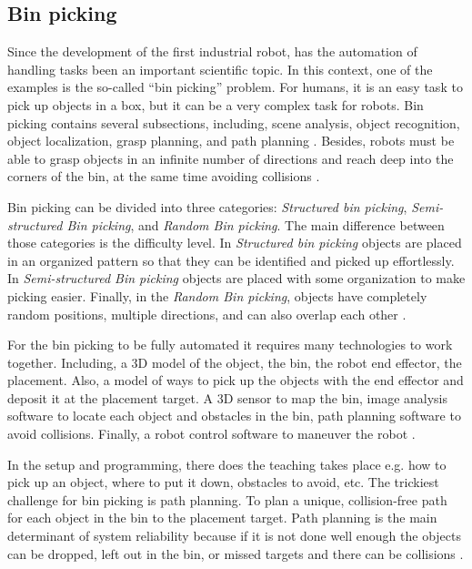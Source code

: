 

\subsection{Bin picking}
Since the development of the first industrial robot, has the automation of handling tasks been an important scientific topic. In this context, one of the examples is the so-called “bin picking” problem. For humans, it is an easy task to pick up objects in a box, but it can be a very complex task for robots. Bin picking contains several subsections, including, scene analysis, object recognition, object localization, grasp planning, and path planning \cite{buchholz_bin-picking_2015}. Besides, robots must be able to grasp objects in an infinite number of directions and reach deep into the corners of the bin, at the same time avoiding collisions \cite{truebenbach_is_2019}.

Bin picking can be divided into three categories: \textit{Structured bin picking}, \textit{Semi-structured Bin picking}, and \textit{Random Bin picking}. The main difference between those categories is the difficulty level. In \textit{Structured bin picking} objects are placed in an organized pattern so that they can be identified and picked up effortlessly. In \textit{Semi-structured Bin picking} objects are placed with some organization to make picking easier. Finally, in the \textit{Random Bin picking}, objects have completely random positions, multiple directions, and can also overlap each other \cite{noauthor_robotworx_nodate}.

For the bin picking to be fully automated it requires many technologies to work together. Including, a 3D model of the object, the bin, the robot end effector, the placement. Also, a model of ways to pick up the objects with the end effector and deposit it at the placement target. A 3D sensor to map the bin, image analysis software to locate each object and obstacles in the bin, path planning software to avoid collisions. Finally, a robot control software to maneuver the robot \cite{truebenbach_is_2019}.


In the setup and programming, there does the teaching takes place e.g. how to pick up an object, where to put it down, obstacles to avoid, etc. The trickiest challenge for bin picking is path planning. To plan a unique, collision-free path for each object in the bin to the placement target. Path planning is the main determinant of system reliability because if it is not done well enough the objects can be dropped, left out in the bin, or missed targets and there can be collisions \cite{truebenbach_is_2019}.





